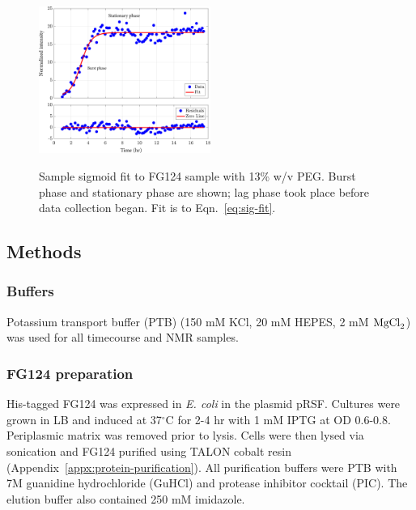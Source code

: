 \begin{figure}
\caption{Sample sigmoid fit to FG124 sample with 13\% w/v PEG.  Burst phase and stationary phase are shown; lag phase took place before data collection began.  Fit is to Eqn.~\ref{eq:sig-fit}.\\}
\centering
\includegraphics[width=0.5\textwidth]{figs/ch05/sample-sigmoid}
\label{fig:sigmoid-fit}
\end{figure}

\subsection{Methods}

\subsubsection{Buffers} Potassium transport buffer (PTB) (150 mM KCl, 20 mM HEPES, 2 mM $\mathrm{MgCl}_2$) was used for all timecourse and NMR samples.

\subsubsection{FG124 preparation} His-tagged FG124 was expressed in \textit{E. coli} in the plasmid pRSF.  Cultures were grown in LB and  induced at 37$^\circ$C for 2-4 hr with 1 mM IPTG at OD 0.6-0.8.  Periplasmic matrix was removed prior to lysis.  Cells were then lysed via sonication and FG124 purified using TALON cobalt resin (Appendix~\ref{appx:protein-purification}).  All purification buffers were PTB with 7M guanidine hydrochloride (GuHCl) and protease inhibitor cocktail (PIC).  The elution buffer also contained 250 mM imidazole.

